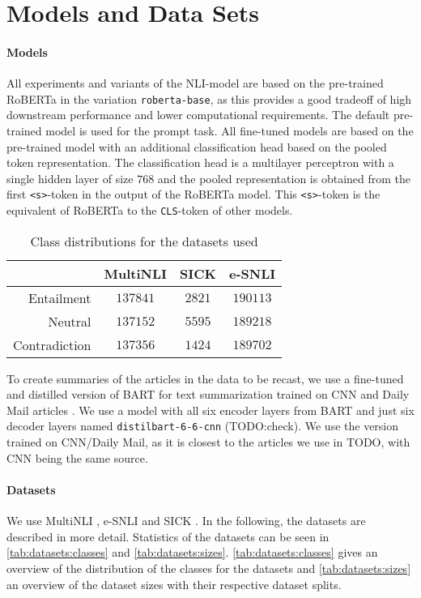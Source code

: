 \section{Models and Data Sets} \label{sec:models_datasets}
\paragraph{Models}
All experiments and variants of the \acs{NLI}-model are based on the pre-trained \acf{RoBERTa} \cite{roberta} in the variation \texttt{roberta-base}, as this provides a good tradeoff of high downstream performance and lower computational requirements. The default pre-trained model is used for the prompt task. All fine-tuned models are based on the pre-trained model with an additional classification head based on the pooled token representation. The classification head is a multilayer perceptron with a single hidden layer of size $768$ and the pooled representation is obtained from the first \texttt{<s>}-token in the output of the \acs{RoBERTa} model. This \texttt{<s>}-token is the equivalent of \acs{RoBERTa} to the \texttt{CLS}-token of other models.

\begin{table}[ht]
    \centering
    \caption{Class distributions for the datasets used}
    \begin{tabular}{r || c | c | c}
        & \acs{MultiNLI} & \acs{SICK} & \acs{e-SNLI} \\
        \midrule
        Entailment & $137841$ & $2821$ & $190113$ \\
        Neutral & $137152$ & $5595$ & $189218$ \\
        Contradiction & $137356$ & $1424$ & $189702$
    \end{tabular}
    \label{tab:datasets:classes}
\end{table}

To create summaries of the articles in the data to be recast, we use a fine-tuned and distilled version of BART \cite{lewis-etal-2020-bart} for text summarization trained on CNN and Daily Mail articles \cite{cnn1,cnn2}. \cite{shleifer2020pretrained} We use a model with all six encoder layers from BART and just six decoder layers named \texttt{distilbart-6-6-cnn} (TODO:check). We use the version trained on CNN/Daily Mail, as it is closest to the articles we use in TODO, with CNN being the same source.

\paragraph{Datasets} \label{par:models_datasets:datasets}
We use \acs{MultiNLI} \cite{multinli}, \acs{e-SNLI} \cite{esnli} and \acs{SICK} \cite{sick}. In the following, the datasets are described in more detail. Statistics of the datasets can be seen in \autoref{tab:datasets:classes} and \autoref{tab:datasets:sizes}. \autoref{tab:datasets:classes} gives an overview of the distribution of the classes for the datasets and \autoref{tab:datasets:sizes} an overview of the dataset sizes with their respective dataset splits.

